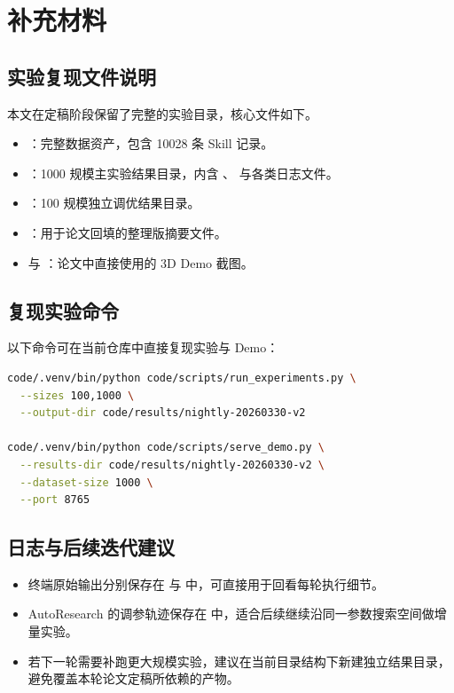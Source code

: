 
\chapter{补充材料}

\section{实验复现文件说明}

本文在定稿阶段保留了完整的实验目录，核心文件如下。

\begin{itemize}
  \item {}：完整数据资产，包含 10028 条 Skill 记录。
  \item {}：1000 规模主实验结果目录，内含 、 与各类日志文件。
  \item {}：100 规模独立调优结果目录。
  \item {}：用于论文回填的整理版摘要文件。
  \item {} 与 ：论文中直接使用的 3D Demo 截图。
\end{itemize}

\section{复现实验命令}

以下命令可在当前仓库中直接复现实验与 Demo：

\begin{lstlisting}[language=bash]
code/.venv/bin/python code/scripts/run_experiments.py \
  --sizes 100,1000 \
  --output-dir code/results/nightly-20260330-v2

code/.venv/bin/python code/scripts/serve_demo.py \
  --results-dir code/results/nightly-20260330-v2 \
  --dataset-size 1000 \
  --port 8765
\end{lstlisting}

\section{日志与后续迭代建议}

\begin{itemize}
  \item 终端原始输出分别保存在  与  中，可直接用于回看每轮执行细节。
  \item AutoResearch 的调参轨迹保存在  中，适合后续继续沿同一参数搜索空间做增量实验。
  \item 若下一轮需要补跑更大规模实验，建议在当前目录结构下新建独立结果目录，避免覆盖本轮论文定稿所依赖的产物。
\end{itemize}
